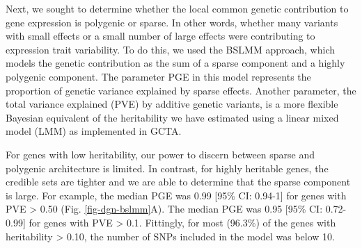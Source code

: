 \documentclass[10pt,letterpaper]{article}
\begin{document}
Next, we sought to determine whether the local common genetic contribution to gene expression is polygenic or sparse. In other words, whether many variants with small effects or a small number of large effects were contributing to expression trait variability. To do this, we used the BSLMM \cite{Zhou_2013} approach, which models the genetic contribution as the sum of a sparse component and a highly polygenic component. The parameter PGE in this model represents the proportion of genetic variance explained by sparse effects. Another parameter, the total variance explained (PVE) by additive genetic variants, is a more flexible Bayesian equivalent of the heritability we have estimated using a linear mixed model (LMM) as implemented in GCTA. 

For genes with low heritability, our power to discern between sparse and polygenic architecture is limited. 
In contrast, for highly heritable genes, the credible sets are tighter and we are able to determine that the sparse component is large. For example, the median PGE was 0.99 [95\% CI: 0.94-1] for genes with PVE \textgreater{} 0.50 (Fig. \ref{fig-dgn-bslmm}A). The median PGE was 0.95 [95\% CI: 0.72-0.99] for genes with PVE \textgreater{} 0.1. Fittingly, for most (96.3\%) of the genes with heritability \textgreater{} 0.10, the number of SNPs included in the model was below 10.
\end{document}
